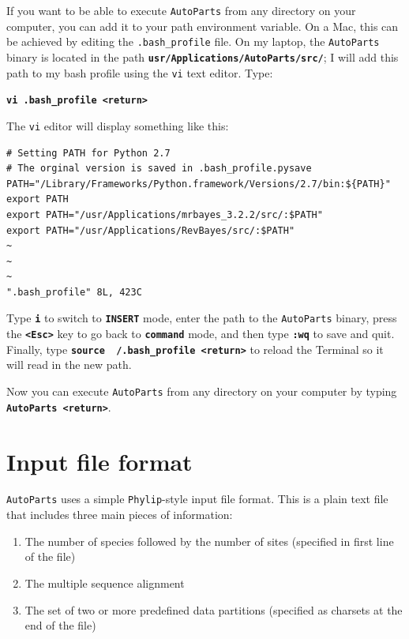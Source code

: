 \documentclass[11pt]{article}
\newcommand{\cl}[1]{{\texttt{\textbf{#1}}}}
\begin{document}
If you want to be able to execute \verb!AutoParts! from any directory on your computer, you can add it to your path environment variable.
On a Mac, this can be achieved by editing the \verb!.bash_profile! file.
On my laptop, the \verb!AutoParts! binary is located in the path \cl{usr/Applications/AutoParts/src/}; I will add this path to my bash profile using the \verb!vi! text editor.
Type:

\cl{vi .bash\_profile <return>}

The \verb!vi! editor will display something like this: \\ \vspace{-15mm}

\begin{center}
\end{center}
{\tt \scriptsize \begin{framed}
\begin{lstlisting}
# Setting PATH for Python 2.7
# The orginal version is saved in .bash_profile.pysave
PATH="/Library/Frameworks/Python.framework/Versions/2.7/bin:${PATH}"
export PATH
export PATH="/usr/Applications/mrbayes_3.2.2/src/:$PATH"
export PATH="/usr/Applications/RevBayes/src/:$PATH"
~                                                                                                                           
~                                                                                                                           
~                                                                                                                           
".bash_profile" 8L, 423C
\end{lstlisting}
\end{framed}}

  
Type \cl{i} to switch to \cl{INSERT} mode, enter the path to the \verb!AutoParts! binary, press the \cl{<Esc>} key to go back to \cl{command} mode, and then type \cl{:wq} to save and quit. 
Finally, type \cl{source ~/.bash\_profile <return>} to reload the Terminal so it will read in the new path.

Now you can execute \verb!AutoParts! from any directory on your computer by typing \cl{AutoParts <return>}.


\bigskip
\section*{Input file format}

\verb!AutoParts! uses a simple \verb!Phylip!-style input file format.
This is a plain text file that includes three main pieces of information:
\begin{enumerate}
\item{The number of species followed by the number of sites (specified in first line of the file)} \\ \vspace{-7mm}
\item{The multiple sequence alignment} \\ \vspace{-7mm}
\item{The set of two or more predefined data partitions (specified as charsets at the end of the file)}
\end{enumerate}
\end{document}
